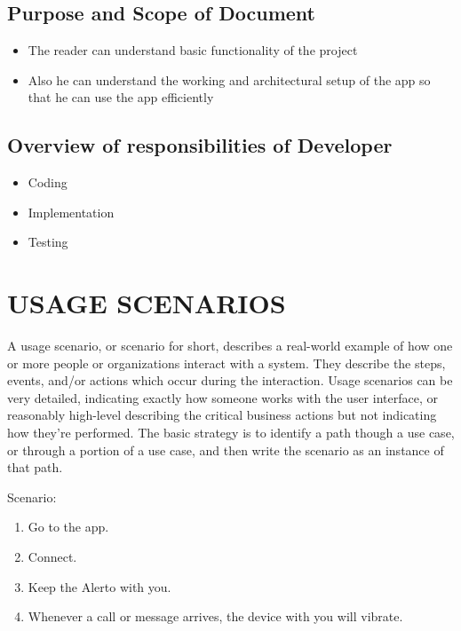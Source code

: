 \documentclass[12pt,a4paper]{report}
\begin{document}
\subsection{Purpose and Scope of Document}
\begin{itemize}
	\item The reader can understand basic functionality of the project
	\item Also he can understand the working and architectural setup of the app so that he can use the app efficiently
\end{itemize}
\subsection{Overview of responsibilities of Developer}
\begin{itemize}
\item Coding
\item Implementation
\item Testing
\end{itemize}
\section{USAGE SCENARIOS}
\hspace{0.2 in}A usage scenario, or scenario for short, describes a real-world example of how one or more people or organizations interact with a system. They describe the steps, events, and/or actions which occur during the interaction. Usage scenarios can be very detailed, indicating exactly how someone works with the user interface, or reasonably high-level describing the critical business actions but not indicating how they're performed. The basic strategy is to identify a path though a use case, or through a portion of a use case, and then write the scenario as an instance of that path.

Scenario:
\begin{enumerate}
	\item Go to the app.
	 \item Connect.
	 \item Keep the Alerto with you.
	 \item Whenever a call or message arrives, the device with you will vibrate.
\end{enumerate}
\end{document}
